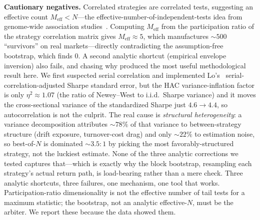 \documentclass[sigconf,review,anonymous]{acmart}
\begin{document}
\textbf{Cautionary negatives.} Correlated strategies are correlated tests, suggesting an effective count $M_{\text{eff}}<N$---the effective-number-of-independent-tests idea from genome-wide association studies~\cite{nyholt2004,galwey2009}. Computing $M_{\text{eff}}$ from the participation ratio of the strategy correlation matrix gives $M_{\text{eff}}{\approx}5$, which manufactures ${\sim}500$ ``survivors'' on real markets---directly contradicting the assumption-free bootstrap, which finds $0$. A second analytic shortcut (empirical envelope inversion) also fails, and chasing why produced the most useful methodological result here. We first suspected serial correlation and implemented Lo's~\cite{lo2002} serial-correlation-adjusted Sharpe standard error, but the HAC variance-inflation factor is only $\eta^2{\approx}1.07$ (the ratio of Newey--West to i.i.d.\ Sharpe variance) and it moves the cross-sectional variance of the standardized Sharpe just $4.6\to4.4$, so autocorrelation is not the culprit. The real cause is \emph{structural heterogeneity}: a variance decomposition attributes ${\sim}78\%$ of that variance to between-strategy structure (drift exposure, turnover-cost drag) and only ${\sim}22\%$ to estimation noise, so best-of-$N$ is dominated ${\sim}3.5{:}1$ by picking the most favorably-structured strategy, not the luckiest estimate. None of the three analytic corrections we tested captures that---which is exactly why the block bootstrap, resampling each strategy's actual return path, is load-bearing rather than a mere check. Three analytic shortcuts, three failures, one mechanism, one tool that works. Participation-ratio dimensionality is not the effective number of tail tests for a maximum statistic; the bootstrap, not an analytic effective-$N$, must be the arbiter. We report these because the data showed them.
\end{document}
